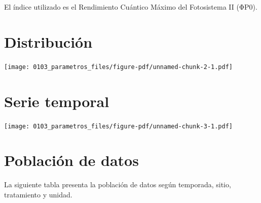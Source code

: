 \documentclass[
  letterpaper,
  DIV=11,
  numbers=noendperiod]{scrreprt}
\begin{document}
El índice utilizado es el Rendimiento Cuántico Máximo del Fotosistema II
(ΦP0).

\chapter{Distribución}

\begin{center}
\texttt{[image: 0103\_parametros\_files/figure-pdf/unnamed-chunk-2-1.pdf]}
\end{center}

\chapter{Serie temporal}

\begin{center}
\texttt{[image: 0103\_parametros\_files/figure-pdf/unnamed-chunk-3-1.pdf]}
\end{center}

\chapter{Población de datos}

La siguiente tabla presenta la población de datos según temporada,
sitio, tratamiento y unidad.
\end{document}
